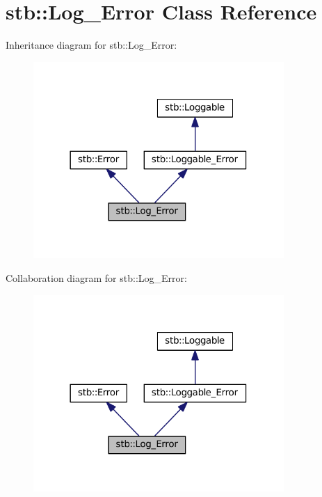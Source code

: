 \hypertarget{classstb_1_1Log__Error}{\section{stb\+:\+:Log\+\_\+\+Error Class Reference}
\label{classstb_1_1Log__Error}
}


Inheritance diagram for stb\+:\+:Log\+\_\+\+Error\+:
\nopagebreak
\begin{figure}[H]
\begin{center}
\leavevmode
\includegraphics[width=270pt]{classstb_1_1Log__Error__inherit__graph}
\end{center}
\end{figure}


Collaboration diagram for stb\+:\+:Log\+\_\+\+Error\+:
\nopagebreak
\begin{figure}[H]
\begin{center}
\leavevmode
\includegraphics[width=270pt]{classstb_1_1Log__Error__coll__graph}
\end{center}
\end{figure}
